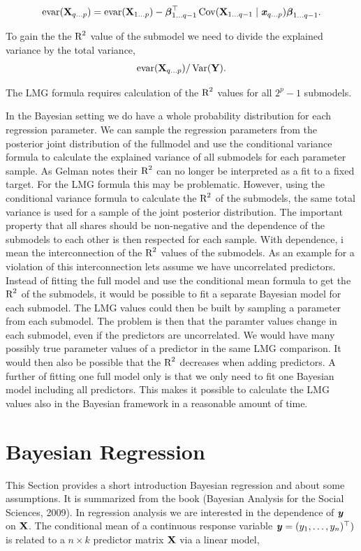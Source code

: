 \documentclass[11pt,a4paper,twoside]{book}\usepackage[]{graphicx}\usepackage[]{color}
\begin{document}
       \begin{align} 
       \text{evar}({\mathbf{X}}_{q \dots p}) =  \text{evar}({\mathbf{X}}_{1  \dots p}) - {\boldsymbol{\beta}}^\top_{1 \dots q-1} \operatorname{Cov}({\mathbf{X}}_{1\dots {q-1}} \mid {\textbf{\textit{x}}}_{q \dots p}) {\boldsymbol{\beta}}_{1 \dots {q-1}}.
   \end{align}

To gain the the $\text{R}^2$ value of the submodel we need to divide the explained variance by the total variance,
       \begin{align} 
\text{evar}({\mathbf{X}}_{q \dots p}) / \operatorname{Var}({\mathbf{Y}}).   
\end{align}

The LMG formula requires calculation of the $\text{R}^2$ values for all $2^p-1$ submodels. 

In the Bayesian setting we do have a whole probability distribution for each regression parameter. We can sample the regression parameters from the posterior joint distribution of the fullmodel and use the conditional variance formula to calculate the explained variance of all submodels for each parameter sample. As Gelman notes their $\text{R}^2$ can no longer be interpreted as a fit to a fixed target. For the LMG formula this may be problematic. However, using the conditional variance formula to calculate the $\text{R}^2$ of the submodels, the same total variance is used for a sample of the joint posterior distribution. The important property that all shares should be non-negative and the dependence of the submodels to each other is then respected for each sample. With dependence, i mean the interconnection of the $\text{R}^2$ values of the submodels. As an example for a violation of this interconnection lets assume we have uncorrelated predictors. Instead of fitting the full model and use the conditional mean formula to get the $\text{R}^2$ of the submodels,  it would be possible to fit a separate Bayesian model for each submodel. The LMG values could then be built by sampling a parameter from each submodel. The problem is then that the paramter values change in each submodel, even if the predictors are uncorrelated. We would have many possibly true parameter values of a predictor in the same LMG comparison. It would then also be possible that the $\text{R}^2$ decreases when adding predictors.  
A further of fitting one full model only  is that we only need to fit one Bayesian model including all predictors. This makes it possible to calculate the LMG values also in the Bayesian framework in a reasonable amount of time. 


\section{Bayesian Regression}
This Section provides a short introduction Bayesian regression and about some assumptions. It is summarized from the book (Bayesian Analysis for the Social Sciences, 2009). 
In regression analysis we are interested in the dependence of ${\textbf{\textit{y}}}$ on ${\mathbf{X}}$. The conditional mean of a continuous response variable ${\textbf{\textit{y}}} = (y_{1}, \dots, y_{n})^\top)$ is related to a $n \times k$ predictor matrix ${\mathbf{X}}$ via a linear model, 
\end{document}
